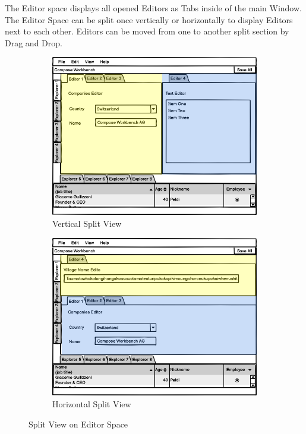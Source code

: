 The Editor space displays all opened Editors as Tabs inside of the main Window. The Editor Space can be split once vertically or horizontally to display Editors next to each other. Editors can be moved from one to another split section by Drag and Drop.

\begin{figure}[H]
\centering
\begin{subfigure}{.5\textwidth}
  \centering
  \includegraphics[width=.9\linewidth]{images/WorkbenchCompose (EditorSpaceVerticalSplit) (EditorSpaceVerticalSplit).png}
  \caption{Vertical Split View}
  \label{fig:ransac_result}
\end{subfigure}%
\begin{subfigure}{.5\textwidth}
  \centering
  \includegraphics[width=.85\linewidth]{images/WorkbenchCompose (EditorSpaceHorizontalSplit) (EditorSpaceHorizontalSplit).png}
  \caption{Horizontal Split View}
  \label{fig:ransac_rotation}
\end{subfigure}
\caption{Split View on Editor Space}
\label{fig:ransac_results}
\end{figure}


